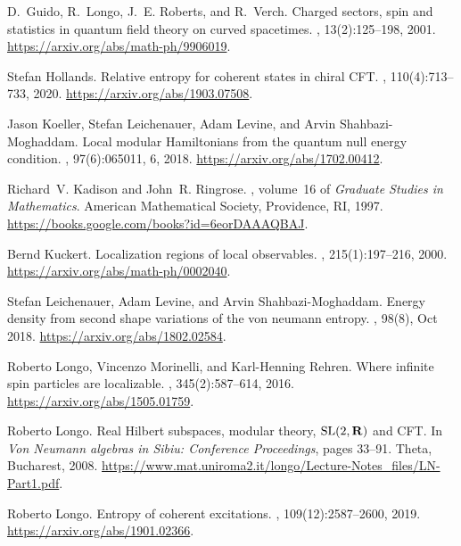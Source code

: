 \documentclass[12pt]{article}
\theoremstyle{remark}
\begin{document}
{\begin{thebibliography}{KLLSM18}
D.~Guido, R.~Longo, J.~E. Roberts, and R.~Verch.
\newblock Charged sectors, spin and statistics in quantum field theory on
  curved spacetimes.
, 13(2):125--198, 2001.
\newblock \url{https://arxiv.org/abs/math-ph/9906019}.

Stefan Hollands.
\newblock Relative entropy for coherent states in chiral {CFT}.
, 110(4):713--733, 2020.
\newblock \url{https://arxiv.org/abs/1903.07508}.

Jason Koeller, Stefan Leichenauer, Adam Levine, and Arvin Shahbazi-Moghaddam.
\newblock Local modular {H}amiltonians from the quantum null energy condition.
, 97(6):065011, 6, 2018.
\newblock \url{https://arxiv.org/abs/1702.00412}.

Richard~V. Kadison and John~R. Ringrose.
,
  volume~16 of {\em Graduate Studies in Mathematics}.
\newblock American Mathematical Society, Providence, RI, 1997.
\newblock \url{https://books.google.com/books?id=6eorDAAAQBAJ}.

Bernd Kuckert.
\newblock Localization regions of local observables.
, 215(1):197--216, 2000.
\newblock \url{https://arxiv.org/abs/math-ph/0002040}.

Stefan Leichenauer, Adam Levine, and Arvin Shahbazi-Moghaddam.
\newblock Energy density from second shape variations of the von neumann
  entropy.
, 98(8), Oct 2018.
\newblock \url{https://arxiv.org/abs/1802.02584}.

Roberto Longo, Vincenzo Morinelli, and Karl-Henning Rehren.
\newblock Where infinite spin particles are localizable.
, 345(2):587--614, 2016.
\newblock \url{https://arxiv.org/abs/1505.01759}.

Roberto Longo.
\newblock Real {H}ilbert subspaces, modular theory, {${\rm SL}(2,{\bf R})$} and
  {CFT}.
\newblock In {\em Von {N}eumann algebras in {S}ibiu: {C}onference
  {P}roceedings}, pages 33--91. Theta, Bucharest, 2008.
\newblock
  \url{https://www.mat.uniroma2.it/longo/Lecture-Notes_files/LN-Part1.pdf}.

Roberto Longo.
\newblock Entropy of coherent excitations.
, 109(12):2587--2600, 2019.
\newblock \url{https://arxiv.org/abs/1901.02366}.


\end{thebibliography}}
\end{document}
